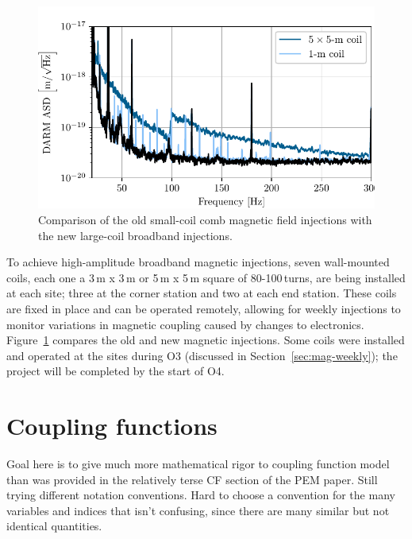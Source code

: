 \begin{figure}[h!]
	\centering
	\includegraphics{figures/noise-methods/injection-wallcoil.pdf}
	\caption{
		Comparison of the old small-coil comb magnetic field injections with the new large-coil broadband injections.}
	\label{fig:injection-wallcoil}
\end{figure}

To achieve high-amplitude broadband magnetic injections, seven wall-mounted coils, each one a 3\,m x 3\,m or 5\,m x 5\,m square of 80-100\,turns, are being installed at each site; three at the corner station and two at each end station. These coils are fixed in place and can be operated remotely, allowing for weekly injections to monitor variations in magnetic coupling caused by changes to electronics. Figure~\ref{fig:injection-wallcoil} compares the old and new magnetic injections. Some coils were installed and operated at the sites during O3 (discussed in Section~\ref{sec:mag-weekly}); the project will be completed by the start of O4.







\section{Coupling functions}\label{sec:cf}

{\color{red}
Goal here is to give much more mathematical rigor to coupling function model than was provided in the relatively terse CF section of the PEM paper.
Still trying different notation conventions.
Hard to choose a convention for the many variables and indices that isn't confusing, since there are many similar but not identical quantities.}

